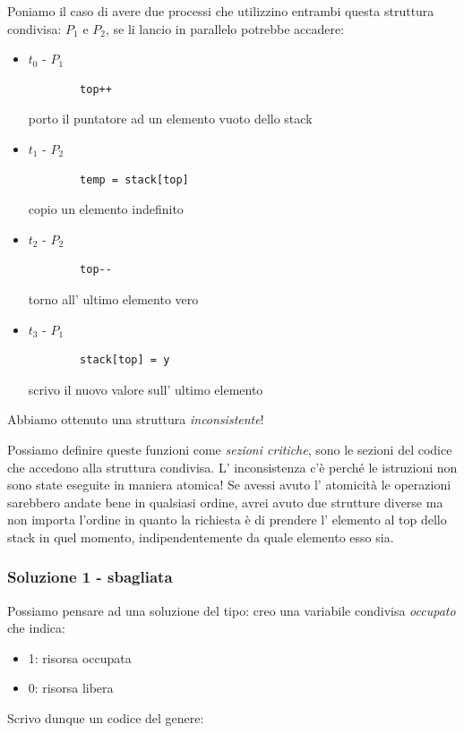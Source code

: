 Poniamo il caso di avere due processi che utilizzino entrambi questa struttura condivisa: $P_1$ e $P_2$, se li lancio in parallelo potrebbe accadere:
\begin{itemize}
    \item $t_0$ - $P_1$
    \begin{verbatim}
        top++
    \end{verbatim}
    porto il puntatore ad un elemento vuoto dello stack

    \item $t_1$ - $P_2$
    \begin{verbatim}
        temp = stack[top]
    \end{verbatim}
    copio un elemento indefinito

    \item $t_2$ - $P_2$
    \begin{verbatim}
        top--
    \end{verbatim}
    torno all' ultimo elemento vero
    
    \item $t_3$ - $P_1$
    \begin{verbatim}
        stack[top] = y
    \end{verbatim}
    scrivo il nuovo valore sull' ultimo elemento
\end{itemize}
Abbiamo ottenuto una struttura \emph{inconsistente}!

Possiamo definire queste funzioni come \emph{sezioni critiche}, sono le sezioni del codice che accedono alla struttura condivisa.
L' inconsistenza c'è perché le istruzioni non sono state eseguite in maniera atomica!
Se avessi avuto l' atomicità le operazioni sarebbero andate bene in qualsiasi ordine, avrei avuto due strutture diverse ma non importa l'ordine in quanto la richiesta è di prendere l' elemento al top dello stack in quel momento, indipendentemente da quale elemento esso sia.

\subsubsection{Soluzione 1 - sbagliata}
Possiamo pensare ad una soluzione del tipo: creo una variabile condivisa \emph{occupato} che indica:
\begin{itemize}
    \item 1: risorsa occupata
    \item 0: risorsa libera
\end{itemize}
Scrivo dunque un codice del genere:

